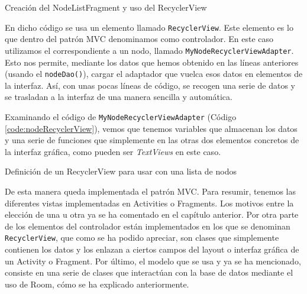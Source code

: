 \begin{code}
	\caption{Creación del NodeListFragment y uso del RecyclerView}
	\label{code:nodeListFragment}
	
\end{code}

En dicho código se usa un elemento llamado \texttt{RecyclerView}. Este elemento es lo que dentro del patrón MVC denominamos como controlador. En este caso utilizamos el correspondiente a un nodo, llamado \texttt{MyNodeRecyclerViewAdapter}. Esto nos permite, mediante los datos que hemos obtenido en las líneas anteriores (usando el \texttt{nodeDao()}), cargar el adaptador que vuelca esos datos en elementos de la interfaz. Así, con unas pocas líneas de código, se recogen una serie de datos y se trasladan a la interfaz de una manera sencilla y automática.

Examinando el código de \texttt{MyNodeRecyclerViewAdapter} (Código \ref{code:nodeRecyclerView}), vemos que tenemos variables que almacenan los datos y una serie de funciones que simplemente en las otras dos elementos concretos de la interfaz gráfica, como pueden ser \textit{TextViews} en este caso.

\begin{code}
	\caption{Definición de un RecyclerView para usar con una lista de nodos}
	\label{code:nodeRecyclerView}
	
\end{code}

De esta manera queda implementada el patrón MVC. Para resumir, tenemos las diferentes vistas implementadas en Activities o Fragments. Los motivos entre la elección de una u otra ya se ha comentado en el capítulo anterior. Por otra parte de los elementos del controlador están implementados en los que se denominan \texttt{RecyclerView}, que como se ha podido apreciar, son clases que simplemente contienen los datos y los enlazan a ciertos campos del layout o interfaz gráfica de un Activity o Fragment. Por último, el modelo que se usa y ya se ha mencionado, consiste en una serie de clases que interactúan con la base de datos mediante el uso de Room, cómo se ha explicado anteriormente.
